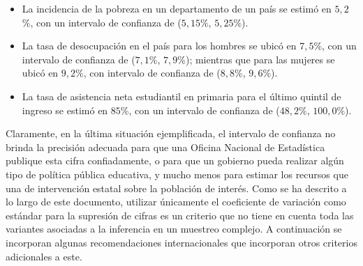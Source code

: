 \documentclass[
  12pt,
]{book}
\providecommand{\tightlist}{%
  \setlength{\itemsep}{0pt}\setlength{\parskip}{0pt}}
\begin{document}
\begin{itemize}
\tightlist
\item
  La incidencia de la pobreza en un departamento de un país se estimó en \(5,2\)\%, con un intervalo de confianza de (\(5,15\)\%, \(5,25\)\%).
\item
  La tasa de desocupación en el país para los hombres se ubicó en \(7,5\)\%, con un intervalo de confianza de (\(7,1\)\%, \(7,9\)\%); mientras que para las mujeres se ubicó en \(9,2\)\%, con intervalo de confianza de (\(8,8\)\%, \(9,6\)\%).
\item
  La tasa de asistencia neta estudiantil en primaria para el último quintil de ingreso se estimó en \(85\)\%, con un intervalo de confianza de (\(48,2\)\%, \(100,0\)\%).
\end{itemize}

Claramente, en la última situación ejemplificada, el intervalo de confianza no brinda la precisión adecuada para que una Oficina Nacional de Estadística publique esta cifra confiadamente, o para que un gobierno pueda realizar algún tipo de política pública educativa, y mucho menos para estimar los recursos que una de intervención estatal sobre la población de interés. Como se ha descrito a lo largo de este documento, utilizar únicamente el coeficiente de variación como estándar para la supresión de cifras es un criterio que no tiene en cuenta toda las variantes asociadas a la inferencia en un muestreo complejo. A continuación se incorporan algunas recomendaciones internacionales que incorporan otros criterios adicionales a este.
\end{document}
